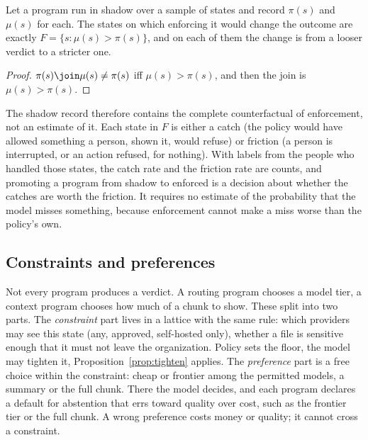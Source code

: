 \begin{proposition}
\label{prop:friction}
Let a program run in shadow over a sample of states and record $\pi(s)$ and
$\mu(s)$ for each. The states on which enforcing it would change the
outcome are exactly $F = \{s : \mu(s) > \pi(s)\}$, and on each of them the
change is from a looser verdict to a stricter one.
\end{proposition}
\begin{proof}
$\pi(s) \join \mu(s) \ne \pi(s)$ iff $\mu(s) > \pi(s)$, and then the
join is $\mu(s) > \pi(s)$.
\end{proof}

The shadow record therefore contains the complete counterfactual of
enforcement, not an estimate of it. Each state in $F$ is either a catch (the
policy would have allowed something a person, shown it, would refuse) or
friction (a person is interrupted, or an action refused, for nothing). With
labels from the people who handled those states, the catch rate and the
friction rate are counts, and promoting a program from shadow to enforced is a
decision about whether the catches are worth the friction. It requires no
estimate of the probability that the model misses something, because
enforcement cannot make a miss worse than the policy's own.

\subsection{Constraints and preferences}

Not every program produces a verdict. A routing program chooses a model tier,
a context program chooses how much of a chunk to show. These split into two
parts. The \emph{constraint} part lives in a lattice with the same rule: which
providers may see this state (any, approved, self-hosted only), whether a file
is sensitive enough that it must not leave the organization. Policy sets the
floor, the model may tighten it, Proposition~\ref{prop:tighten} applies. The
\emph{preference} part is a free choice within the constraint: cheap or
frontier among the permitted models, a summary or the full chunk. There the
model decides, and each program declares a default for abstention that errs
toward quality over cost, such as the frontier tier or the full chunk. A wrong
preference costs money or quality; it cannot cross a constraint.
